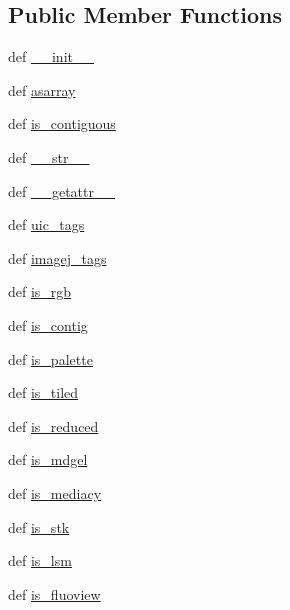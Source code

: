 \subsection*{Public Member Functions}
\begin{DoxyCompactItemize}
\item 
def \hyperlink{classtifffile_1_1TiffPage_a91ce69df8f42151984d02d4054908c13}{\-\_\-\-\_\-init\-\_\-\-\_\-}
\item 
def \hyperlink{classtifffile_1_1TiffPage_a5953a258881256d704bd3d0c34a09bea}{asarray}
\item 
def \hyperlink{classtifffile_1_1TiffPage_ad0679ea4c15ca29548ae87e4986a7811}{is\-\_\-contiguous}
\item 
def \hyperlink{classtifffile_1_1TiffPage_af0e5e72edfa67d9f1239b194cbd7a56b}{\-\_\-\-\_\-str\-\_\-\-\_\-}
\item 
def \hyperlink{classtifffile_1_1TiffPage_a43cd8883f12805d887c2994582110e42}{\-\_\-\-\_\-getattr\-\_\-\-\_\-}
\item 
def \hyperlink{classtifffile_1_1TiffPage_a56fb86bb7966d84b7b72d1edc297eaed}{uic\-\_\-tags}
\item 
def \hyperlink{classtifffile_1_1TiffPage_acd582c08af3fc15fa22bbc4f6b7d4a4d}{imagej\-\_\-tags}
\item 
def \hyperlink{classtifffile_1_1TiffPage_aad80ffe0eb6611da60f78ad2743298a0}{is\-\_\-rgb}
\item 
def \hyperlink{classtifffile_1_1TiffPage_a1af194b01da49777e8d7585a987f6ccf}{is\-\_\-contig}
\item 
def \hyperlink{classtifffile_1_1TiffPage_aca723b525070789164837eb2ce3b366f}{is\-\_\-palette}
\item 
def \hyperlink{classtifffile_1_1TiffPage_afcf12e643a6207d0a02184ab19485489}{is\-\_\-tiled}
\item 
def \hyperlink{classtifffile_1_1TiffPage_af5f9892583d02082fd1be22ebe653a28}{is\-\_\-reduced}
\item 
def \hyperlink{classtifffile_1_1TiffPage_a11f2d006bbe32f212252c65a9bb9adcb}{is\-\_\-mdgel}
\item 
def \hyperlink{classtifffile_1_1TiffPage_a664758db65e7865792cc53dd01946054}{is\-\_\-mediacy}
\item 
def \hyperlink{classtifffile_1_1TiffPage_a7e17dfd14c887008863f4f800e701df1}{is\-\_\-stk}
\item 
def \hyperlink{classtifffile_1_1TiffPage_a22c271c0c693e40335409c006dc6fb0b}{is\-\_\-lsm}
\item 
def \hyperlink{classtifffile_1_1TiffPage_ab0fab509161b423ac295e4e9b1944c86}{is\-\_\-fluoview}

\end{DoxyCompactItemize}
